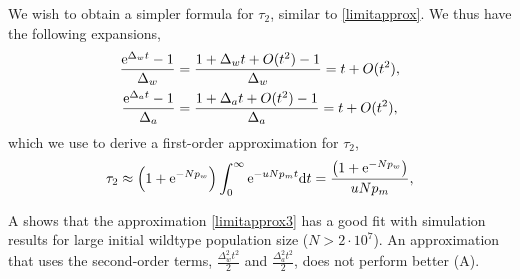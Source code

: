\documentclass[12pt]{extarticle}
\renewcommand{\d}[1]{\ensuremath{\operatorname{d}\!{#1}}}
\renewcommand{\d}{{\rm d}}
\newcommand{\e}{{\rm e}}
\newcommand{\erfc}{{\rm erfc}}
\begin{document}
We wish to obtain a simpler formula for $\tau_2$, similar to \cref{limitapprox}.
We thus have the following expansions,
%
\begin{align*}
\frac{\e^{\Delta_w t}-1}{\Delta_w}&=\frac{1+\Delta_w t+O(t^2)-1}{\Delta_w} = t+O(t^2),\\
\frac{\e^{\Delta_a t}-1}{\Delta_a}&=\frac{1+\Delta_a t+O(t^2)-1}{\Delta_a} = t+O(t^2),
\end{align*}
which we use to derive a first-order approximation for $\tau_2$,
\begin{align}\label{limitapprox3}
\tau_2 \approx
\left(1+\e^{-Np_w}\right)\int_0^\infty\e^{-u N p_m t} \d t = 
\frac{\left(1+\e^{-Np_w}\right)}{uNp_m} ,
\end{align}

A shows that the approximation \cref{limitapprox3} has a good fit with simulation results for large initial wildtype population size ($N > 2\cdot10^7$). An approximation that uses the second-order terms, $\frac{\Delta_w^2 t^2}{2}$ and $\frac{\Delta_a^2 t^2}{2}$, does not perform better (A).
\\
\end{document}
